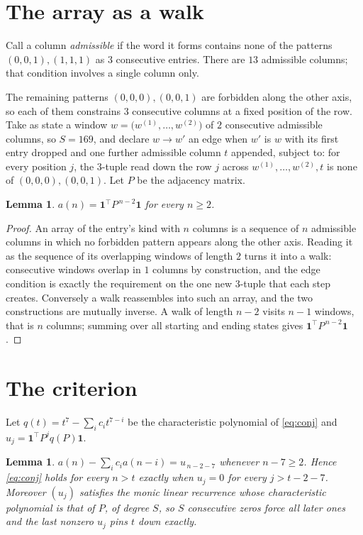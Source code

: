 \documentclass[11pt,a4paper]{article}
\theoremstyle{plain}
\newtheorem{lemma}[theorem]{Lemma}
\theoremstyle{definition}
\begin{document}
\section{The array as a walk}

Call a column \emph{admissible} if the word it forms contains none of the patterns
$(0,0,1), (1,1,1)$ as $3$ consecutive entries. There are $13$ admissible columns; that condition
involves a single column only.

The remaining patterns $(0,0,0), (0,0,1)$ are forbidden along the other axis, so each of them
constrains $3$ consecutive columns at a fixed position of the row. Take as state a
window $w=\bigl(w^{(1)},\dots,w^{(2)}\bigr)$ of $2$ consecutive admissible
columns, so $S=169$, and declare $w\to w'$ an edge when $w'$ is $w$ with its first entry
dropped and one further admissible column $t$ appended, subject to: for every position
$j$, the $3$-tuple read down the row $j$ across $w^{(1)},\dots,w^{(2)},t$
is none of $(0,0,0), (0,0,1)$. Let $P$ be the adjacency matrix.

\begin{lemma}\label{lem:walk}
$a(n)=\mathbf{1}^{\!\top}P^{\,n-2}\mathbf{1}$ for every $n\ge2$.
\end{lemma}

\begin{proof}
An array of the entry's kind with $n$ columns is a sequence of $n$ admissible columns in
which no forbidden pattern appears along the other axis. Reading it as the sequence of its
overlapping windows of length $2$ turns it into a walk: consecutive windows overlap in
$1$ columns by construction, and the edge condition is exactly the requirement on the one
new $3$-tuple that each step creates. Conversely a walk reassembles into such an array,
and the two constructions are mutually inverse. A walk of length $n-2$ visits $n-1$
windows, that is $n$ columns; summing over all starting and ending states gives
$\mathbf{1}^{\!\top}P^{\,n-2}\mathbf{1}$.
\end{proof}

\section{The criterion}

Let $q(t)=t^{7}-\sum_i c_i t^{7-i}$ be the characteristic polynomial of
\eqref{eq:conj} and $u_j=\mathbf{1}^{\!\top}P^{j}q(P)\mathbf{1}$.

\begin{lemma}\label{lem:crit}
$a(n)-\sum_i c_i a(n-i)=u_{\,n-2-7}$ whenever $n-7\ge2$. Hence
\eqref{eq:conj} holds for every $n>t$ exactly when $u_j=0$ for every
$j>t-2-7$. Moreover $(u_j)$ satisfies the monic linear recurrence whose
characteristic polynomial is that of $P$, of degree $S$, so $S$ consecutive zeros force all
later ones and the last nonzero $u_j$ pins $t$ down exactly.
\end{lemma}
\end{document}
